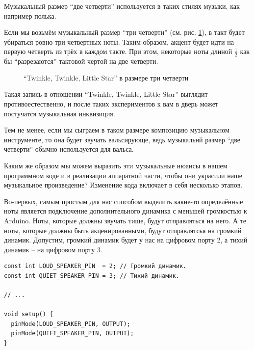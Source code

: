\documentclass[a4paper,twoside]{book}
\newcounter{example-counter}
\begin{document}
Музыкальный размер ``две четверти'' используется в таких стилях музыки, как
например полька.

Если мы возьмём музыкальный размер ``три четверти''
(см. рис. \ref{fig:lilypond-musical-scale-example-4}), в такт будет убираться
ровно три четвертных ноты.  Таким образом, акцент будет идти на первую четверть
из трёх в каждом такте.  При этом, некоторые ноты длиной $\frac{1}{2}$ как бы
``разрезаются'' тактовой чертой на две четверти.

\begin{figure}[ht]
  \caption{``Twinkle, Twinkle, Little Star'' в размере три четверти}
  \centering
  \label{fig:lilypond-musical-scale-example-4}
\end{figure}

Такая запись в отношении ``Twinkle, Twinkle, Little Star'' выглядит
противоестественно, и после таких экспериментов к вам в дверь может постучатся
музыкальная инквизиция.

Тем не менее, если мы сыграем в таком размере композицию музыкальном
инструменте, то она будет звучать вальсирующе, ведь музыкальнй размер ``две
четверти'' обычно используется для вальса.

Каким же образом мы можем выразить эти музыкальные нюансы в нашем программном
коде и в реализации аппаратной части, чтобы они украсили наше музыкальное
произведение?  Изменение кода включает в себя несколько этапов.

Во-первых, самым простым для нас способом выделить какие-то определённые ноты
является подключение дополнительного динамика с меньшей громкостью к Arduino.
Ноты, которые должны звучать тише, будут отправляться на него.  А те ноты,
которые должны быть акценированными, будут отправлятсья на громкий динамик.
Допустим, громкий динамик будет у нас на цифровом порту 2, а тихий динамик -- на
цифровом порту 3.

\begin{verbatim}
const int LOUD_SPEAKER_PIN  = 2; // Громкий динамик.
const int QUIET_SPEAKER_PIN = 3; // Тихий динамик.

// ...

void setup() {
  pinMode(LOUD_SPEAKER_PIN, OUTPUT);
  pinMode(QUIET_SPEAKER_PIN, OUTPUT);
}
\end{verbatim}
\end{document}
